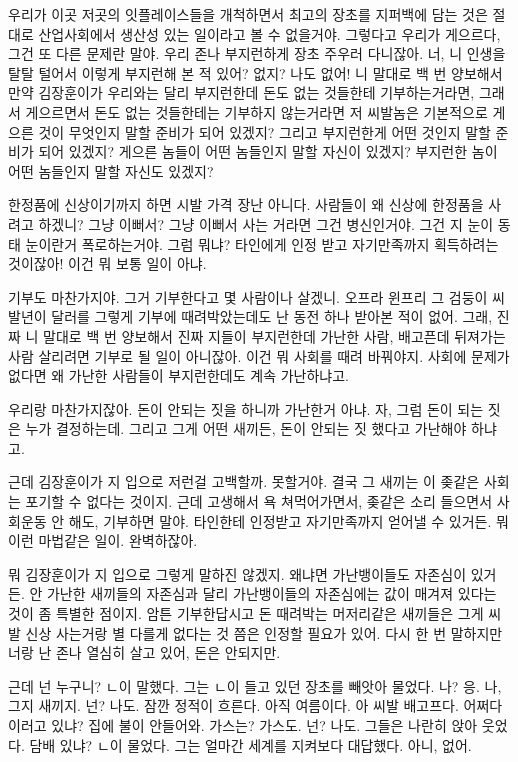 \documentclass[a5paper,10pt, twoside, openright]{memoir}
\begin{document}
	우리가 이곳 저곳의 잇플레이스들을 개척하면서 최고의 장초를 지퍼백에 담는 것은 절대로 산업사회에서 생산성 있는 일이라고 볼 수 없을거야. 그렇다고 우리가 게으르다, 그건 또 다른 문제란 말야. 우리 존나 부지런하게 장초 주우러 다니잖아. 너, 니 인생을 탈탈 털어서 이렇게 부지런해 본 적 있어? 없지? 나도 없어! 니 말대로 백 번 양보해서 만약 김장훈이가 우리와는 달리 부지런한데 돈도 없는 것들한테 기부하는거라면, 그래서 게으르면서 돈도 없는 것들한테는 기부하지 않는거라면 저 씨발놈은 기본적으로 게으른 것이 무엇인지 말할 준비가 되어 있겠지? 그리고 부지런한게 어떤 것인지 말할 준비가 되어 있겠지? 게으른 놈들이 어떤 놈들인지 말할 자신이 있겠지? 부지런한 놈이 어떤 놈들인지 말할 자신도 있겠지?

	한정품에 신상이기까지 하면 시발 가격 장난 아니다. 사람들이 왜 신상에 한정품을 사려고 하겠니? 그냥 이뻐서? 그냥 이뻐서 사는 거라면 그건 병신인거야. 그건 지 눈이 동태 눈이란거 폭로하는거야. 그럼 뭐냐? 타인에게 인정 받고 자기만족까지 획득하려는 것이잖아! 이건 뭐 보통 일이 아냐. 

	기부도 마찬가지야. 그거 기부한다고 몇 사람이나 살겠니. 오프라 윈프리 그 검둥이 씨발년이 달러를 그렇게 기부에 때려박았는데도 난 동전 하나 받아본 적이 없어. 그래, 진짜 니 말대로 백 번 양보해서 진짜 지들이 부지런한데 가난한 사람, 배고픈데 뒤져가는 사람 살리려면 기부로 될 일이 아니잖아. 이건 뭐 사회를 때려 바꿔야지. 사회에 문제가 없다면 왜 가난한 사람들이 부지런한데도 계속 가난하냐고. 

	우리랑 마찬가지잖아. 돈이 안되는 짓을 하니까 가난한거 아냐. 자, 그럼 돈이 되는 짓은 누가 결정하는데. 그리고 그게 어떤 새끼든, 돈이 안되는 짓 했다고 가난해야 하냐고. 

	근데 김장훈이가 지 입으로 저런걸 고백할까. 못할거야. 결국 그 새끼는 이 좆같은 사회는 포기할 수 없다는 것이지. 근데 고생해서 욕 쳐먹어가면서, 좆같은 소리 들으면서 사회운동 안 해도, 기부하면 말야. 타인한테 인정받고 자기만족까지 얻어낼 수 있거든. 뭐 이런 마법같은 일이. 완벽하잖아.

	뭐 김장훈이가 지 입으로 그렇게 말하진 않겠지. 왜냐면 가난뱅이들도 자존심이 있거든. 안 가난한 새끼들의 자존심과 달리 가난뱅이들의 자존심에는 값이 매겨져 있다는 것이 좀 특별한 점이지. 암튼 기부한답시고 돈 때려박는 머저리같은 새끼들은 그게 씨발 신상 사는거랑 별 다를게 없다는 것 쯤은 인정할 필요가 있어. 다시 한 번 말하지만 너랑 난 존나 열심히 살고 있어, 돈은 안되지만. 

	근데 넌 누구니? ㄴ이 말했다. 그는 ㄴ이 들고 있던 장초를 빼앗아 물었다. 나? 응. 나, 그지 새끼지. 넌? 나도. 잠깐 정적이 흐른다. 아직 여름이다. 아 씨발 배고프다. 어쩌다 이러고 있냐? 집에 불이 안들어와. 가스는? 가스도. 넌? 나도. 그들은 나란히 앉아 웃었다. 담배 있냐? ㄴ이 물었다. 그는 얼마간 세계를 지켜보다 대답했다. 아니, 없어. 
\end{document}
